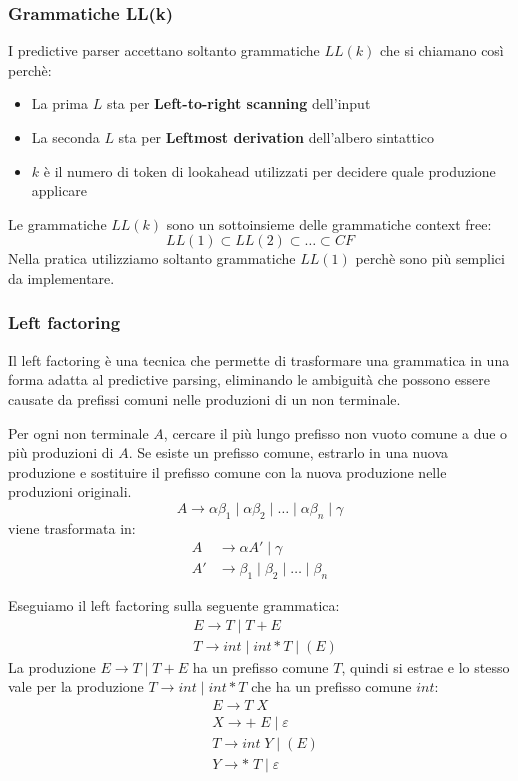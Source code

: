 \documentclass[a4paper]{article}
\begin{document}
\subsubsection{Grammatiche LL(k)}
I predictive parser accettano soltanto grammatiche \( LL(k) \) che si chiamano così
perchè:
\begin{itemize}
  \item La prima \( L \) sta per \textbf{Left-to-right scanning} dell'input
  \item La seconda \( L \) sta per \textbf{Leftmost derivation} dell'albero sintattico
  \item \( k \) è il numero di token di lookahead utilizzati per decidere quale
    produzione applicare
\end{itemize}
Le grammatiche \( LL(k) \) sono un sottoinsieme delle grammatiche context free:
\[
   LL(1) \subset LL(2) \subset \ldots \subset CF
\] 
Nella pratica utilizziamo soltanto grammatiche \( LL(1) \) perchè sono più semplici
da implementare.

\subsubsection{Left factoring}
Il left factoring è una tecnica che permette di trasformare una grammatica in una
forma adatta al predictive parsing, eliminando le ambiguità che possono essere
causate da prefissi comuni nelle produzioni di un non terminale.
\begin{definition}
  Per ogni non terminale \( A \), cercare il più lungo prefisso non vuoto comune a
  due o più produzioni di \( A \). Se esiste un prefisso comune, estrarlo in una
  nuova produzione e sostituire il prefisso comune con la nuova produzione nelle
  produzioni originali.
  \[
    A \to \alpha \beta_1 \mid \alpha \beta_2 \mid \ldots \mid \alpha \beta_n
     \mid \gamma 
  \] 
  viene trasformata in:
  \[
    \begin{aligned}
      A  &\to \alpha A' \mid \gamma \\
      A' &\to \beta_1 \mid \beta_2 \mid \ldots \mid \beta_n
    \end{aligned}
  \] 
\end{definition}

\begin{example}
  Eseguiamo il left factoring sulla seguente grammatica:
  \[
    \begin{aligned}
      &E \to T \mid T + E \\
      &T \to int \mid int * T \mid (E)
    \end{aligned}
  \] 
  La produzione \( E \to T \mid T + E \) ha un prefisso comune \( T \), quindi si
  estrae e lo stesso vale per la produzione \( T \to int \mid int * T \) che ha un
  prefisso comune \( int \):
  \[
    \begin{aligned}
      &E \to T \; X \\
      &X \to + \; E \mid \varepsilon \\
      &T \to int \; Y \mid (E) \\
      &Y \to * \; T \mid \varepsilon
    \end{aligned}
  \] 
\end{example}
\end{document}

